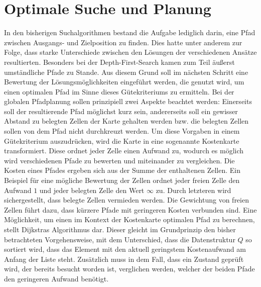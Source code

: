 \section{Optimale Suche und Planung}
In den bisherigen Suchalgorithmen bestand die Aufgabe lediglich darin, eine Pfad zwischen Ausgangs- und Zielposition zu finden. Dies hatte unter anderem zur Folge, dass starke Unterschiede zwischen den Lösungen der verschiedenen Ansätze resultierten. Besonders bei der Depth-First-Search kamen zum Teil äußerst umständliche Pfade zu Stande. Aus diesem Grund soll im nächsten Schritt eine Bewertung der Lösungsmöglichkeiten eingeführt werden, die genutzt wird, um einen optimalen Pfad im Sinne dieses Gütekriteriums zu ermitteln. Bei der globalen Pfadplanung sollen prinzipiell zwei Aspekte beachtet werden: Einerseits soll der resultierende Pfad möglichst kurz sein, andererseits soll ein gewisser Abstand zu belegten Zellen der Karte gehalten werden bzw. die belegten Zellen sollen von dem Pfad nicht durchkreuzt werden. Um diese Vorgaben in einem Gütekriterium auszudrücken, wird die Karte in eine sogenannte Kostenkarte transformiert. Diese ordnet jeder Zelle einen Aufwand zu, wodurch es möglich wird verschiedenen Pfade zu bewerten und miteinander zu vergleichen. Die Kosten eines Pfades ergeben sich aus der Summe der enthaltenen Zellen. Ein Beispiel für eine mögliche Bewertung der Zellen ordnet jeder freien Zelle den Aufwand $1$ und jeder belegten Zelle den Wert $\infty$ zu. Durch letzteren wird sichergestellt, dass belegte Zellen vermieden werden. Die Gewichtung von freien Zellen führt dazu, dass kürzere Pfade mit geringeren Kosten verbunden sind. Eine Möglichkeit, um einen im Kontext der Kostenkarte optimalen Pfad zu berechnen, stellt Dijkstras Algorithmus dar. Dieser gleicht im Grundprinzip den bisher betrachteten Vorgehensweise, mit dem Unterschied, dass die Datenstruktur $Q$ so sortiert wird, dass das Element mit den aktuell geringstem Kostenaufwand am Anfang der Liste steht. Zusätzlich muss in dem Fall, dass ein Zustand geprüft wird, der bereits besucht worden ist, verglichen werden, welcher der beiden Pfade den geringeren Aufwand benötigt.

